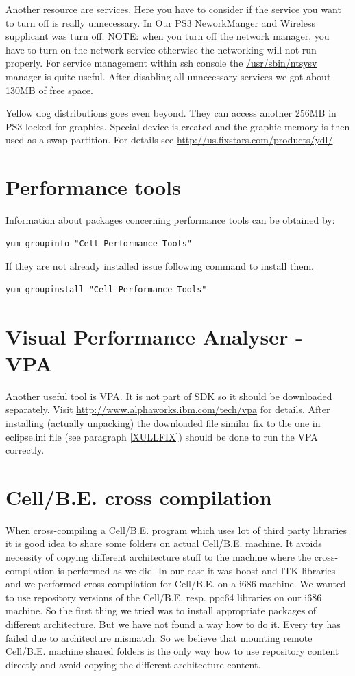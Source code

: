 \par
Another resource are services.
Here you have to consider if the service you want to turn off is really unnecessary.
In Our PS3 NeworkManger and Wireless supplicant was turn off.
NOTE: when you turn off the network manager, you have to turn on the network service otherwise the networking will not run properly.
For service management within ssh console the \url{/usr/sbin/ntsysv} manager is quite useful.
After disabling all unnecessary services we got about 130MB of free space.

\par
Yellow dog distributions goes even beyond.
They can access another 256MB in PS3 locked for graphics.
Special device is created and the graphic memory is then used as a swap partition.
For details see \url{http://us.fixstars.com/products/ydl/}.

\section{Performance tools}

Information about packages concerning performance tools can be obtained by:
\begin{verbatim}
yum groupinfo "Cell Performance Tools"
\end{verbatim}
If they are not already installed issue following command to install them.
\begin{verbatim}
yum groupinstall "Cell Performance Tools"
\end{verbatim}

\section{Visual Performance Analyser - VPA}

Another useful tool is VPA. It is not part of SDK so it should be downloaded separately.
Visit \url{http://www.alphaworks.ibm.com/tech/vpa} for details.
After installing (actually unpacking) the downloaded file similar fix to the one in eclipse.ini file (see paragraph \ref{XULLFIX}) should be done to run the VPA correctly.

\section{\mbox{Cell/B.E.} cross compilation}

When cross-compiling a \mbox{Cell/B.E.} program which uses lot of third party libraries it is good idea to share some folders on actual \mbox{Cell/B.E.} machine.
It avoids necessity of copying different architecture stuff to the machine where the cross-compilation is performed as we did.
In our case it was boost and ITK libraries and we performed cross-compilation for \mbox{Cell/B.E.} on a i686 machine.
We wanted to use repository versions of the \mbox{Cell/B.E.} resp. ppc64 libraries on our i686 machine.
So the first thing we tried was to install appropriate packages of different architecture.
But we have not found a way how to do it.
Every try has failed due to architecture mismatch.
So we believe that mounting remote \mbox{Cell/B.E.} machine shared folders is the only way how to use repository content directly and avoid copying the different architecture content.
